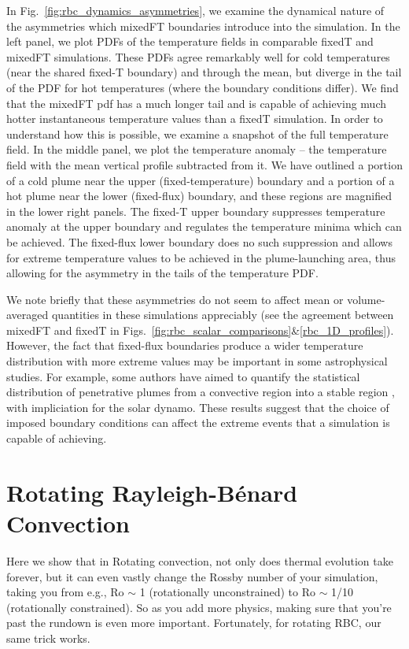 \documentclass[aps, pre, onecolumn, nofootinbib, notitlepage, groupedaddress, amsfonts, amssymb, amsmath, longbibliography]{revtex4-1}
\newcommand{\RB}{Rayleigh-B\'{e}nard }
\begin{document}
In Fig.~\ref{fig:rbc_dynamics_asymmetries}, we examine the dynamical nature of the asymmetries which mixedFT boundaries introduce into the simulation.
In the left panel, we plot PDFs of the temperature fields in comparable fixedT and mixedFT simulations.
These PDFs agree remarkably well for cold temperatures (near the shared fixed-T boundary) and through the mean, but diverge in the tail of the PDF for hot temperatures (where the boundary conditions differ).
We find that the mixedFT pdf has a much longer tail and is capable of achieving much hotter instantaneous temperature values than a fixedT simulation.
In order to understand how this is possible, we examine a snapshot of the full temperature field.
In the middle panel, we plot the temperature anomaly -- the temperature field with the mean vertical profile subtracted from it.
We have outlined a portion of a cold plume near the upper (fixed-temperature) boundary and a portion of a hot plume near the lower (fixed-flux) boundary, and these regions are magnified in the lower right panels.
The fixed-T upper boundary suppresses temperature anomaly at the upper boundary and regulates the temperature minima which can be achieved.
The fixed-flux lower boundary does no such suppression and allows for extreme temperature values to be achieved in the plume-launching area, thus allowing for the asymmetry in the tails of the temperature PDF.

We note briefly that these asymmetries do not seem to affect mean or volume-averaged quantities in these simulations appreciably (see the agreement between mixedFT and fixedT in Figs.~\ref{fig:rbc_scalar_comparisons}\&\ref{rbc_1D_profiles}).
However, the fact that fixed-flux boundaries produce a wider temperature distribution with more extreme values may be important in some astrophysical studies.
For example, some authors have aimed to quantify the statistical distribution of penetrative plumes from a convective region into a stable region \cite{pratt&all2017}, with impliciation for the solar dynamo.
These results suggest that the choice of imposed boundary conditions can affect the extreme events that a simulation is capable of achieving.





\section{Rotating \RB Convection}
\label{sec:rotating_results}
Here we show that in Rotating convection, not only does thermal evolution take forever, but it can even vastly change the Rossby number of your simulation, taking you from e.g., Ro $\sim$ 1 (rotationally unconstrained) to Ro $\sim$ 1/10 (rotationally constrained).
So as you add more physics, making sure that you're past the rundown is even more important.
Fortunately, for rotating RBC, our same trick works.
\end{document}

